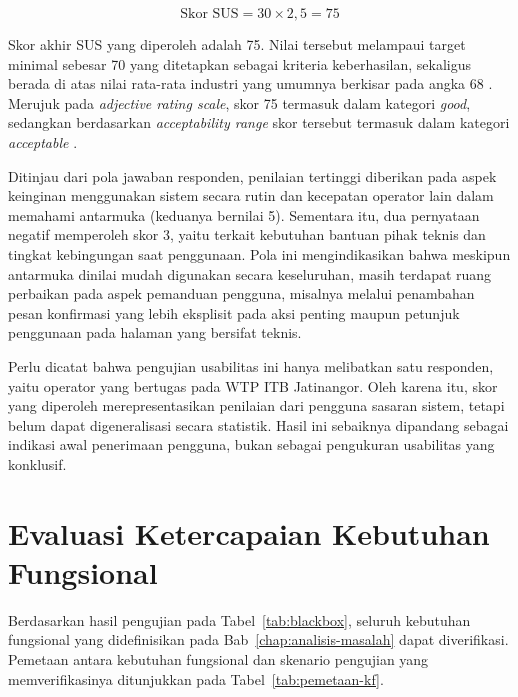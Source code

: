 \begin{equation*}
    \text{Skor SUS} = 30 \times 2{,}5 = 75
\end{equation*}

Skor akhir SUS yang diperoleh adalah 75. Nilai tersebut melampaui target minimal sebesar 70 yang ditetapkan 
sebagai kriteria keberhasilan, sekaligus berada di atas nilai rata-rata industri yang umumnya berkisar pada 
angka 68 \autocite{sauro2011sus}. Merujuk pada \textit{adjective rating scale}, skor 75 termasuk dalam kategori 
\textit{good}, sedangkan berdasarkan \textit{acceptability range} skor tersebut termasuk dalam kategori 
\textit{acceptable} \autocite{bangor2009sus}.

Ditinjau dari pola jawaban responden, penilaian tertinggi diberikan pada aspek keinginan menggunakan sistem 
secara rutin dan kecepatan operator lain dalam memahami antarmuka (keduanya bernilai 5). Sementara itu, dua 
pernyataan negatif memperoleh skor 3, yaitu terkait kebutuhan bantuan pihak teknis dan tingkat kebingungan saat 
penggunaan. Pola ini mengindikasikan bahwa meskipun antarmuka dinilai mudah digunakan secara keseluruhan, masih 
terdapat ruang perbaikan pada aspek pemanduan pengguna, misalnya melalui penambahan pesan konfirmasi yang lebih 
eksplisit pada aksi penting maupun petunjuk penggunaan pada halaman yang bersifat teknis.

Perlu dicatat bahwa pengujian usabilitas ini hanya melibatkan satu responden, yaitu operator yang bertugas pada 
WTP ITB Jatinangor. Oleh karena itu, skor yang diperoleh merepresentasikan penilaian dari pengguna sasaran 
sistem, tetapi belum dapat digeneralisasi secara statistik. Hasil ini sebaiknya dipandang sebagai indikasi awal 
penerimaan pengguna, bukan sebagai pengukuran usabilitas yang konklusif.

\section{Evaluasi Ketercapaian Kebutuhan Fungsional}
Berdasarkan hasil pengujian pada Tabel~\ref{tab:blackbox}, seluruh kebutuhan fungsional yang didefinisikan pada 
Bab~\ref{chap:analisis-masalah} dapat diverifikasi. Pemetaan antara kebutuhan fungsional dan skenario pengujian 
yang memverifikasinya ditunjukkan pada Tabel~\ref{tab:pemetaan-kf}.

